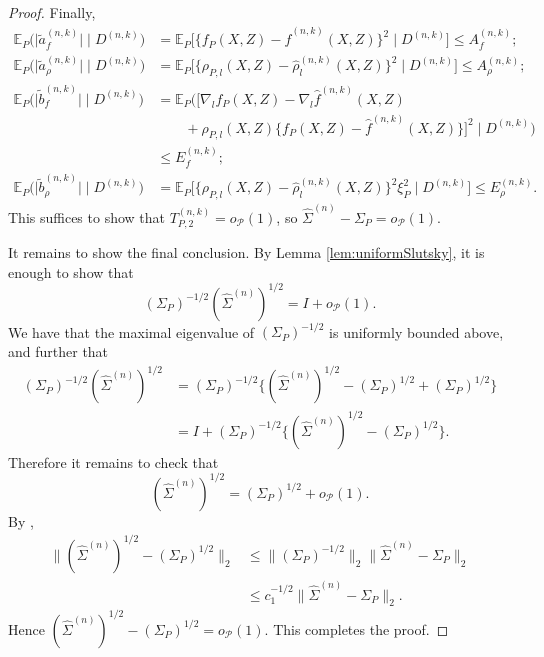 \documentclass[aos]{imsart}
\newcommand{\E}{\mathbb{E}}
\begin{document}
\begin{proof}
		Finally,
		\begin{align*}
			\E_P\Big(\big|\tilde a_f^{(n,k)}\big|\;\Big|\; D^{(n,k)}\Big) &=  \E_P\Big[ \big\{f_P(X,Z)-\hat f^{(n,k)}(X,Z)\big\}^2 \;\Big|\; D^{(n,k)}\Big]  \leq  A_f^{(n,k)};\\
			\E_P\Big(\big|\tilde a_\rho^{(n,k)}\big|\;\Big|\; D^{(n,k)}\Big) &=  \E_P\Big[ \big\{\rho_{P,l}(X,Z)-\hat\rho_l^{(n,k)}(X,Z)\big\}^2 \;\Big|\; D^{(n,k)}\Big] \leq  A_\rho^{(n,k)};\\
			\E_P\Big(\big|\tilde b_f^{(n,k)}\big| \;\Big|\; D^{(n,k)}\Big) &=  \E_P\Big(\big[\nabla_l f_P(X,Z)-\nabla_l \hat f^{(n,k)}(X,Z) \\
			& \qquad+\rho_{P,l}(X,Z)\big\{f_P(X,Z)-\hat f^{(n,k)}(X,Z)\big\}\big]^2 \;\Big|\; D^{(n,k)}\Big)\\
			&\leq  E_f^{(n,k)};\\
			\E_P\Big(\big|\tilde b_\rho^{(n,k)}\big|\;\Big|\; D^{(n,k)}\Big) &=  \E_P\Big[ \big\{\rho_{P,l}(X,Z)-\hat\rho_l^{(n,k)}(X,Z)\big\}^2 \xi_P^2 \;\Big|\; D^{(n,k)}\Big] \leq  E_\rho^{(n,k)}.
		\end{align*}
		This suffices to show that $T^{(n,k)}_{P,2} = o_\mathcal{P}(1)$, so $\hat\Sigma^{(n)}-\Sigma_P = o_\mathcal{P}(1)$.
		
		It remains to show the final conclusion. By Lemma \ref{lem:uniformSlutsky}, it is enough to show that \begin{equation*}
			(\Sigma_P)^{-1/2}(\hat \Sigma^{(n)})^{1/2} = I+o_\mathcal{P}(1).
		\end{equation*}
		We have that the maximal eigenvalue of $(\Sigma_P)^{-1/2}$ is uniformly bounded above, and further that 
		\begin{align*}
			(\Sigma_P)^{-1/2}(\hat \Sigma^{(n)})^{1/2} &=(\Sigma_P)^{-1/2}\big\{(\hat \Sigma^{(n)})^{1/2} - (\Sigma_P)^{1/2} + (\Sigma_P)^{1/2}\big\}\\
			&=I+(\Sigma_P)^{-1/2}\big\{(\hat \Sigma^{(n)})^{1/2} - (\Sigma_P)^{1/2} \big\}.
		\end{align*}
		Therefore it remains to check that 
		\begin{equation*}
			(\hat \Sigma^{(n)})^{1/2} = (\Sigma_P)^{1/2}+o_\mathcal{P}(1).
		\end{equation*} By \citet[Eqn.~(7.2.13)]{HornMatrix}, \begin{align*}
			\big\|(\hat \Sigma^{(n)})^{1/2}  
			- (\Sigma_P)^{1/2} \big\|_2 &\leq \big\|(\Sigma_P)^{-1/2} \big\|_2  \|\hat \Sigma^{(n)} - \Sigma_P \|_2\\
			&\leq c_1^{-1/2}  \|\hat \Sigma^{(n)} - \Sigma_P \|_2.
		\end{align*}
		Hence $(\hat \Sigma^{(n)})^{1/2} - (\Sigma_P)^{1/2} = o_\mathcal{P}(1)$.
		This completes the proof.
	\end{proof}
	
\end{document}
